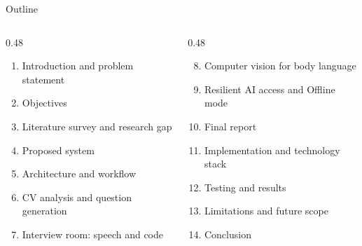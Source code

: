 \documentclass[aspectratio=169,11pt,xcolor=table]{beamer}
\begin{document}
\begin{frame}{Outline}
  \begin{columns}[T]
    \begin{column}{0.48\textwidth}
      \begin{enumerate}
        \item Introduction and problem statement
        \item Objectives
        \item Literature survey and research gap
        \item Proposed system
        \item Architecture and workflow
        \item CV analysis and question generation
        \item Interview room: speech and code
      \end{enumerate}
    \end{column}
    \begin{column}{0.48\textwidth}
      \begin{enumerate}\setcounter{enumi}{7}
        \item Computer vision for body language
        \item Resilient AI access and Offline mode
        \item Final report
        \item Implementation and technology stack
        \item Testing and results
        \item Limitations and future scope
        \item Conclusion
      \end{enumerate}
    \end{column}
  \end{columns}
\end{frame}

\end{document}
